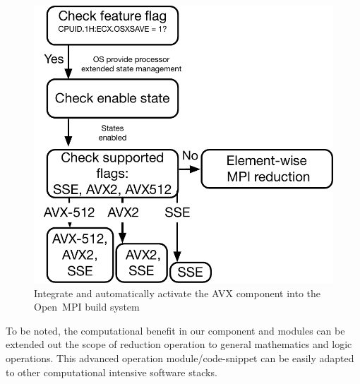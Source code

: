 \documentclass[sigconf]{acmart}
\newcommand{\ompi}[0]{Open~MPI\xspace}
\begin{document}
\begin{figure}[h]
    \centering
    \includegraphics[scale=.45]{avx-graph.pdf}
    \caption{Integrate and automatically activate the AVX component into the \ompi build system}
    \label{fig:512flow}
\end{figure}

To be noted, the computational benefit in our component and modules can be
extended out the scope of reduction operation to general mathematics and logic operations.
This advanced operation module/code-snippet can be easily adapted to other computational intensive software stacks.
\end{document}

